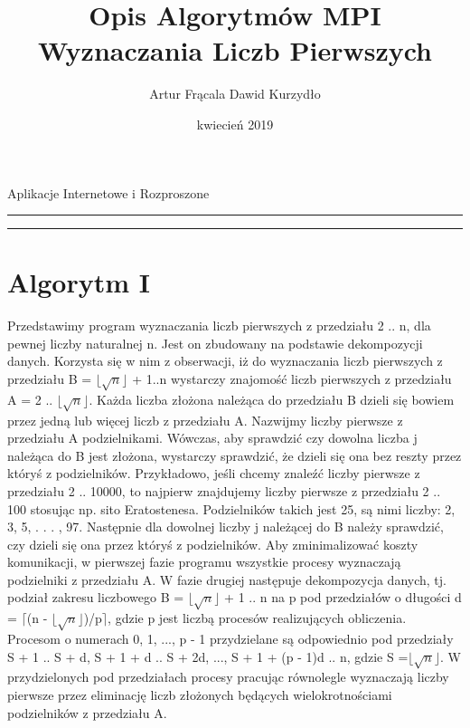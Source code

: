 \documentclass[a4paper,11pt]{article}
\title{Opis Algorytmów MPI Wyznaczania Liczb Pierwszych}
\author{Artur Frącala
        Dawid Kurzydło}
\date{kwiecień 2019}
\begin{document}
  \begin{center}\Large
Aplikacje Internetowe i Rozproszone
\end{center}
  \hrule
  {\let\newpage\relax\maketitle}
  \hrule


  \section{Algorytm I}
    Przedstawimy program wyznaczania liczb pierwszych z przedziału 2 .. n, dla pewnej liczby naturalnej n.
    Jest on zbudowany na podstawie dekompozycji danych.
    Korzysta się w nim z obserwacji, iż do wyznaczania liczb pierwszych z przedziału B = $\lfloor\sqrt{n}\rfloor$ + 1..n wystarczy znajomość liczb pierwszych z przedziału A = 2 .. $\lfloor\sqrt{n}\rfloor$.
    Każda liczba złożona należąca do przedziału B dzieli się bowiem przez jedną lub więcej liczb z przedziału A.
    Nazwijmy liczby pierwsze z przedziału A podzielnikami.
    Wówczas, aby sprawdzić czy dowolna liczba j należąca do B jest złożona, wystarczy sprawdzić, że dzieli się ona bez reszty przez któryś z podzielników.
    Przykładowo, jeśli chcemy znaleźć liczby pierwsze z przedziału 2 .. 10000, to najpierw znajdujemy liczby pierwsze z przedziału 2 .. 100 stosując np. sito Eratostenesa.
    Podzielników takich jest 25, są nimi liczby: 2, 3, 5, . . . , 97.
    Następnie dla dowolnej liczby j należącej do B należy sprawdzić, czy dzieli się ona przez któryś z podzielników.
    Aby zminimalizować koszty komunikacji, w pierwszej fazie programu wszystkie procesy wyznaczają podzielniki z przedziału A.
    W fazie drugiej następuje dekompozycja danych, tj. podział zakresu liczbowego B = $\lfloor\sqrt{n}\rfloor$ + 1 .. n na p pod przedziałów o długości d = $\lceil$(n - $\lfloor\sqrt{n}\rfloor$)/p$\rceil$, gdzie p jest liczbą procesów realizujących obliczenia.
    Procesom o numerach 0, 1, ..., p - 1 przydzielane są odpowiednio pod przedziały S + 1 .. S + d, S + 1 + d .. S + 2d, ..., S + 1 + (p - 1)d .. n, gdzie S =$\lfloor\sqrt{n}\rfloor$.
    W przydzielonych pod przedziałach procesy pracując równolegle wyznaczają liczby pierwsze przez eliminację liczb złożonych będących wielokrotnościami podzielników z przedziału A.
\end{document}
